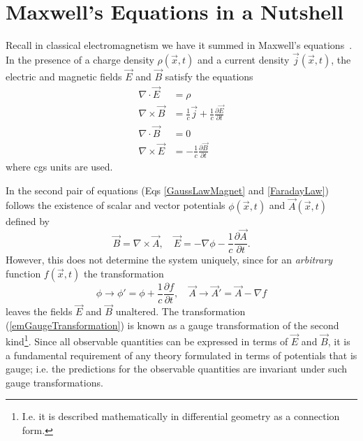 \section{Maxwell's Equations in a Nutshell}

Recall in classical electromagnetism we have it summed in Maxwell's equations~\cite{jackson}. In the presence of a charge density $\rho(\vec{x},t)$ and a 
current density $\vec{j}(\vec{x},t)$, the electric and magnetic fields $\vec{E}$
and $\vec{B}$ satisfy the equations
\begin{subequations}\label{maxwellsEquations}
\begin{align}
\nabla\cdot\vec{E}&=\rho\label{gaussLaw}\\
\nabla\times\vec{B}&=\frac{1}{c}\vec{j} + \frac{1}{c}\frac{\partial\vec{E}}{\partial t}\label{AmpereLaw}\\
\nabla\cdot\vec{B} &= 0\label{GaussLawMagnet}\\
\nabla\times\vec{E} &= -\frac{1}{c}\frac{\partial\vec{B}}{\partial t} \label{FaradayLaw}
\end{align}
\end{subequations}
where cgs units are used.

In the second pair of equations (Eqs \ref{GaussLawMagnet} and \ref{FaradayLaw})
follows the existence of scalar and vector potentials $\phi(\vec{x},t)$ and
$\vec{A}(\vec{x},t)$ defined by
\begin{equation}
\vec{B} = \nabla\times\vec{A},\quad\vec{E}=-\nabla\phi - \frac{1}{c}\frac{\partial\vec{A}}{\partial t}.
\end{equation}
However, this does not determine the system uniquely, since for an \emph{arbitrary}
function $f(\vec{x},t)$ the transformation
\begin{equation}\label{emGaugeTransformation}
\phi\to\phi'=\phi + \frac{1}{c}\frac{\partial f}{\partial t},\quad\vec{A}\to\vec{A}' = \vec{A} - \nabla f
\end{equation}
leaves the fields $\vec{E}$ and $\vec{B}$ unaltered. The transformation (\ref{emGaugeTransformation})
is known as a gauge transformation of the second kind\footnote{I.e. it is described
mathematically in differential geometry as a connection form.}. Since all 
observable quantities can be expressed in terms of 
$\vec{E}$ and $\vec{B}$, it is a fundamental requirement of any theory
formulated in terms of potentials that is gauge; i.e. the predictions for the 
observable quantities are invariant under such gauge transformations.

